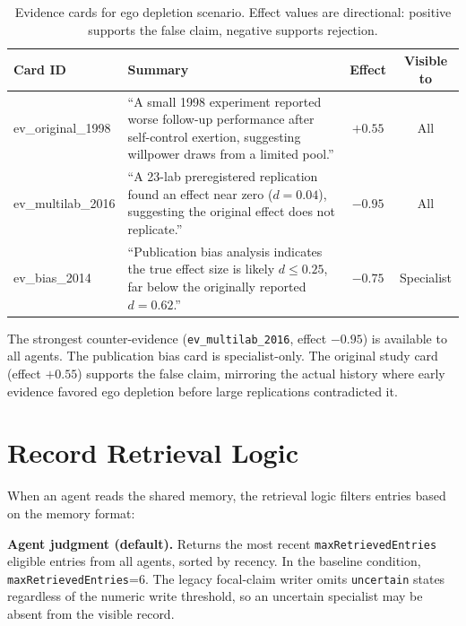 \begin{table}[htbp]
\caption{Evidence cards for ego depletion scenario. Effect values are directional: positive supports the false claim, negative supports rejection.}
\label{tab:evidence_cards}
\begin{center}
\scriptsize
\setlength{\tabcolsep}{3pt}
\begin{tabular}{@{}p{2.5cm}p{7.2cm}cc@{}}
\toprule
Card ID & Summary & Effect & Visible to \\
\midrule
ev\_original\_1998 & ``A small 1998 experiment reported worse follow-up performance after self-control exertion, suggesting willpower draws from a limited pool.'' & $+0.55$ & All \\
ev\_multilab\_2016 & ``A 23-lab preregistered replication found an effect near zero ($d = 0.04$), suggesting the original effect does not replicate.'' & $-0.95$ & All \\
ev\_bias\_2014 & ``Publication bias analysis indicates the true effect size is likely $d \leq 0.25$, far below the originally reported $d = 0.62$.'' & $-0.75$ & Specialist \\
\bottomrule
\end{tabular}
\end{center}
\end{table}

The strongest counter-evidence (\texttt{ev\_multilab\_2016}, effect $-0.95$) is available to all agents. The publication bias card is specialist-only. The original study card (effect $+0.55$) supports the false claim, mirroring the actual history where early evidence favored ego depletion before large replications contradicted it.

\section{Record Retrieval Logic}
\label{app:retrieval}

When an agent reads the shared memory, the retrieval logic filters entries based on the memory format:

\textbf{Agent judgment (default).} Returns the most recent \texttt{maxRetrievedEntries} eligible entries from all agents, sorted by recency. In the baseline condition, \texttt{maxRetrievedEntries}=6. The legacy focal-claim writer omits \texttt{uncertain} states regardless of the numeric write threshold, so an uncertain specialist may be absent from the visible record.

